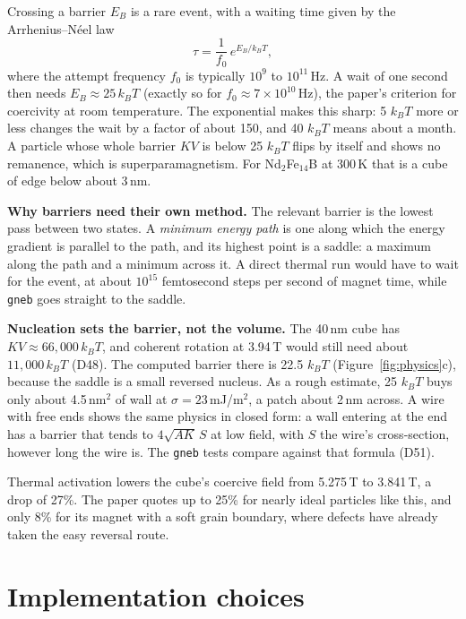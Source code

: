 \documentclass[10pt,a4paper]{article}
\newcommand{\code}[1]{\texttt{#1}}
\newcommand{\dec}[1]{\textcolor{comment}{\small(#1)}}
\begin{document}
Crossing a barrier $E_B$ is a rare event, with a waiting time given by the Arrhenius--N\'eel law
\[
  \tau = \frac{1}{f_0}\,e^{E_B/k_BT},
\]
where the attempt frequency $f_0$ is typically $10^9$ to $10^{11}$\,Hz. A wait of one second then needs $E_B\approx
25\,k_BT$ (exactly so for $f_0 \approx 7\times10^{10}$\,Hz), the paper's criterion for coercivity at room temperature. The
exponential makes this sharp: 5 $k_BT$ more or less changes the wait by a factor of about 150, and 40 $k_BT$ means about
a month. A particle whose whole barrier $KV$ is below 25 $k_BT$ flips by itself and shows no remanence, which is
superparamagnetism. For Nd$_2$Fe$_{14}$B at 300\,K that is a cube of edge below about 3\,nm.

\textbf{Why barriers need their own method.} The relevant barrier is the lowest pass between two states. A
\emph{minimum energy path} is one along which the energy gradient is parallel to the path, and its highest point is a
saddle: a maximum along the path and a minimum across it. A direct thermal run would have to wait for the event, at
about $10^{15}$ femtosecond steps per second of magnet time, while \code{gneb} goes straight to the saddle.

\textbf{Nucleation sets the barrier, not the volume.} The 40\,nm cube has $KV \approx 66{,}000\,k_BT$, and coherent
rotation at 3.94\,T would still need about $11{,}000\,k_BT$ \dec{D48}. The computed barrier there is 22.5 $k_BT$
(Figure~\ref{fig:physics}c), because the saddle is a small reversed nucleus. As a rough estimate, 25 $k_BT$ buys
only about 4.5\,nm$^2$ of wall at $\sigma = 23$\,mJ/m$^2$, a patch about 2\,nm across. A wire with free ends shows the
same physics in closed form: a wall entering at the end has a barrier that tends to $4\sqrt{AK}\,S$ at low field, with $S$
the wire's cross-section, however long the wire is. The \code{gneb} tests compare against that formula \dec{D51}.

Thermal activation lowers the cube's coercive field from 5.275\,T to 3.841\,T, a drop of 27\%. The paper quotes up to
25\% for nearly ideal particles like this, and only 8\% for its magnet with a soft grain boundary, where defects have
already taken the easy reversal route.

\section{Implementation choices}
\end{document}
